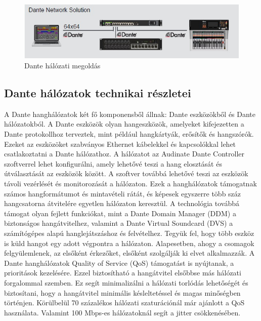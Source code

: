 \begin{figure}[H]
	\centering
	\includegraphics[width=\linewidth, keepaspectratio]{figures/dante-solution.jpg}
	\caption{Dante hálózati megoldás}
	\label {fig:dante-solution}
\end{figure}




\subsection{Dante hálózatok technikai részletei}
A Dante hanghálózatok két fő komponensből állnak: Dante eszközökből
és Dante hálózatokból. A Dante eszközök olyan hangeszközök, amelyeket
kifejezetten a Dante protokollhoz terveztek, mint például hangkártyák, erősítők
és hangszórók. Ezeket az eszközöket szabványos Ethernet kábelekkel és
kapcsolókkal lehet csatlakoztatni a Dante hálózathoz.
A hálózatot az Audinate Dante Controller szoftverrel lehet
konfigurálni, amely lehetővé teszi a hang elosztását és útválasztását az
eszközök között. A szoftver továbbá lehetővé teszi az eszközök távoli vezérlését
és monitorozását a hálózaton. Ezek a hanghálózatok támogatnak számos
hangformátumot és mintavételi rátát, és képesek egyszerre több száz hangcsatorna
átvitelére egyetlen hálózaton keresztül. A technológia továbbá támogat olyan
fejlett funkciókat, mint a Dante Domain Manager (DDM) a biztonságos
hangátvitelhez, valamint a Dante Virtual Soundcard (DVS) a számítógépes alapú
hanglejátszáshoz és felvételhez. 
Tegyük fel, hogy több eszköz is küld hangot egy adott végpontra a hálózaton.
Alapesetben, ahogy a csomagok felgyülemlenek, az elsőként érkezőket, elsőként szolgálják ki elvet alkalmazzák.
A Dante hanghálózatok Quality of Service (QoS)
támogatást is nyújtanak, a prioritások kezelésére.
Ezzel biztosítható a hangátvitel elsőbbse más hálózati forgalommal szemben. Ez segít minimalizálni a hálózati
torlódás lehetőségét és biztosítani, hogy a hangátvitel minimális késleltetéssel
és magas minőségben történjen. 
Körülbelül 70 százalékos hálózati szaturációnál már ajánlott a QoS használata.
Valamint 100 Mbps-es hálózatoknál segít a jitter csökkenésében.




